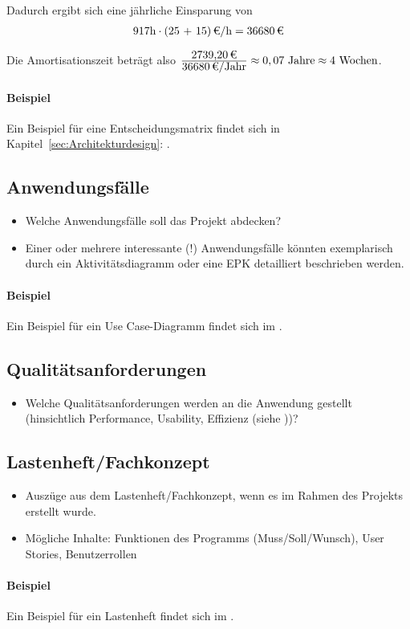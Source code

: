 Dadurch ergibt sich eine jährliche Einsparung von 
\begin{eqnarray}
917 \mbox{h} \cdot \eur{(25 + 15)}{\mbox{/h}} = \eur{36680}
\end{eqnarray}

Die Amortisationszeit beträgt also $\frac{\eur{2739,20}}{\eur{36680}\mbox{/Jahr}} \approx 0,07 \mbox{ Jahre} \approx 4 \mbox{ Wochen}$.

\paragraph{Beispiel}
Ein Beispiel für eine Entscheidungsmatrix findet sich in Kapitel~\ref{sec:Architekturdesign}: .


\subsection{Anwendungsfälle}
\label{sec:Anwendungsfaelle}
\begin{itemize}
	\item Welche Anwendungsfälle soll das Projekt abdecken?
	\item Einer oder mehrere interessante (!) Anwendungsfälle könnten exemplarisch durch ein Aktivitätsdiagramm oder eine \ac{EPK} detailliert beschrieben werden. 
\end{itemize}

\paragraph{Beispiel}
Ein Beispiel für ein Use Case-Diagramm findet sich im .


\subsection{Qualitätsanforderungen}
\label{sec:Qualitaetsanforderungen}
\begin{itemize}
	\item Welche Qualitätsanforderungen werden an die Anwendung gestellt (\zB hinsichtlich Performance, Usability, Effizienz \etc (siehe \citet{ISO9126}))?
\end{itemize}


\subsection{Lastenheft/Fachkonzept}
\label{sec:Lastenheft}
\begin{itemize}
	\item Auszüge aus dem Lastenheft/Fachkonzept, wenn es im Rahmen des Projekts erstellt wurde.
	\item Mögliche Inhalte: Funktionen des Programms (Muss/Soll/Wunsch), User Stories, Benutzerrollen
\end{itemize}

\paragraph{Beispiel}
Ein Beispiel für ein Lastenheft findet sich im . 
